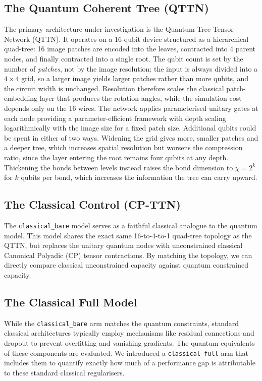 \documentclass[12pt, a4paper, oneside]{report}
\begin{document}
\subsection{The Quantum Coherent Tree (QTTN)}
The primary architecture under investigation is the Quantum Tree Tensor Network (QTTN). It operates on a 16-qubit device structured as a hierarchical quad-tree: 16 image patches are encoded into the leaves, contracted into 4 parent nodes, and finally contracted into a single root. The qubit count is set by the number of \textit{patches}, not by the image resolution: the input is always divided into a $4 \times 4$ grid, so a larger image yields larger patches rather than more qubits, and the circuit width is unchanged. Resolution therefore scales the classical patch-embedding layer that produces the rotation angles, while the simulation cost depends only on the 16 wires. The network applies parameterised unitary gates at each node providing a parameter-efficient framework with depth scaling logarithmically with the image size for a fixed patch size. Additional qubits could be spent in either of two ways. Widening the grid gives more, smaller patches and a deeper tree, which increases spatial resolution but worsens the compression ratio, since the layer entering the root remains four qubits at any depth. Thickening the bonds between levels instead raises the bond dimension to $\chi = 2^k$ for $k$ qubits per bond, which increases the information the tree can carry upward.

\subsection{The Classical Control (CP-TTN)}
The \texttt{classical\_bare} model serves as a faithful classical analogue to the quantum model. This model shares the exact same 16-to-4-to-1 quad-tree topology as the QTTN, but replaces the unitary quantum nodes with unconstrained classical Canonical Polyadic (CP)\cite{cp_decomposition} tensor contractions. By matching the topology, we can directly compare classical unconstrained capacity against quantum constrained capacity.

\subsection{The Classical Full Model}
While the \texttt{classical\_bare} arm matches the quantum constraints, standard classical architectures typically employ mechanisms like residual connections and dropout to prevent overfitting and vanishing gradients. The quantum equivalents of these components are evaluated. We introduced a \texttt{classical\_full} arm that includes them to quantify exactly how much of a performance gap is attributable to these standard classical regularisers.
\end{document}
